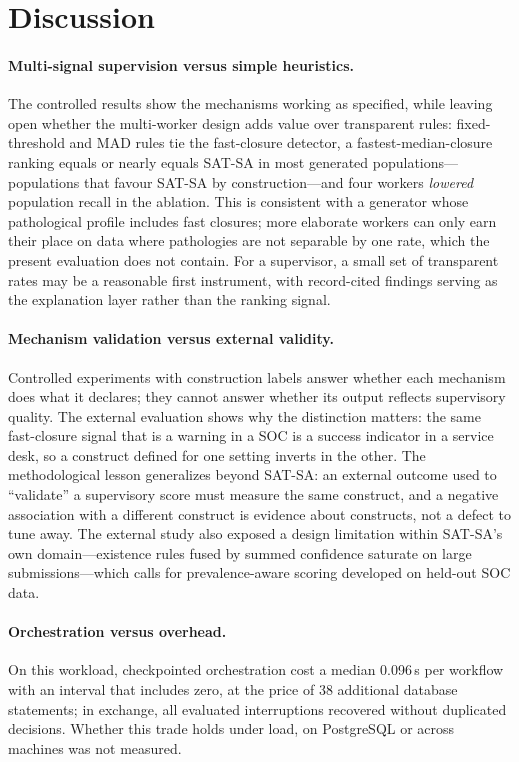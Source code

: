 \section{Discussion}
\label{sec:discussion}

\paragraph{Multi-signal supervision versus simple heuristics.} The controlled results
show the mechanisms working as specified, while leaving open whether the multi-worker
design adds value over transparent rules: fixed-threshold and MAD rules tie the
fast-closure detector, a fastest-median-closure ranking equals or nearly equals SAT-SA
in most generated populations---populations that favour SAT-SA by construction---and
four workers \emph{lowered} population recall in the ablation. This is consistent with
a generator whose pathological profile includes fast closures; more elaborate workers
can only earn their place on data where pathologies are not separable by one rate,
which the present evaluation does not contain. For a supervisor, a small set of transparent
rates may be a reasonable first instrument, with record-cited findings serving as the
explanation layer rather than the ranking signal.

\paragraph{Mechanism validation versus external validity.} Controlled experiments with
construction labels answer whether each mechanism does what it declares; they cannot
answer whether its output reflects supervisory quality. The external evaluation shows
why the distinction matters: the same fast-closure signal that is a warning in a SOC is
a success indicator in a service desk, so a construct defined for one setting inverts
in the other. The methodological lesson generalizes beyond SAT-SA: an external outcome
used to ``validate'' a supervisory score must measure the same construct, and a
negative association with a different construct is evidence about constructs, not a
defect to tune away. The external study also exposed a design limitation within SAT-SA's
own domain---existence rules fused by summed confidence saturate on large
submissions---which calls for prevalence-aware scoring developed on held-out SOC data.

\paragraph{Orchestration versus overhead.} On this workload, checkpointed orchestration
cost a median 0.096\,s per workflow with an interval that includes zero, at
the price of 38 additional database statements; in exchange, all evaluated
interruptions recovered without duplicated decisions. Whether this trade holds under
load, on PostgreSQL or across machines was not measured.

